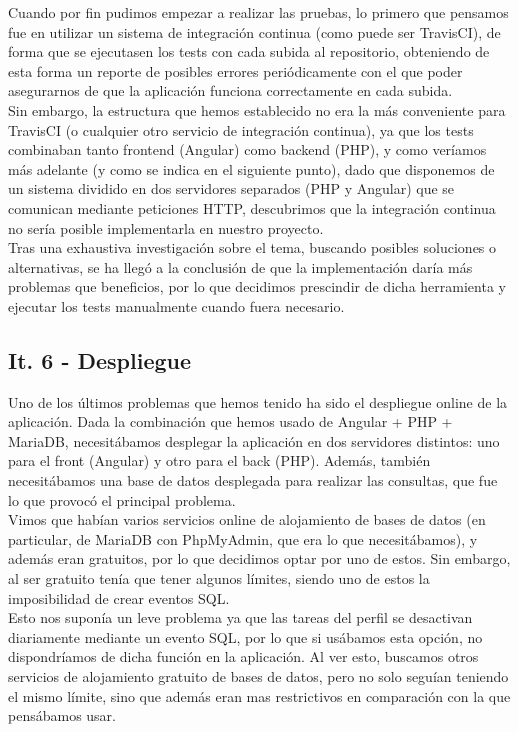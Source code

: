 Cuando por fin pudimos empezar a realizar las pruebas, lo primero que pensamos fue en utilizar un sistema de integración continua (como puede ser TravisCI), de forma que se ejecutasen los tests con cada subida al repositorio, obteniendo de esta forma un reporte de posibles errores periódicamente con el que poder asegurarnos de que la aplicación funciona correctamente en cada subida.\\

Sin embargo, la estructura que hemos establecido no era la más conveniente para TravisCI (o cualquier otro servicio de integración continua), ya que los tests combinaban tanto frontend (Angular) como backend (PHP), y como veríamos más adelante (y como se indica en el siguiente punto), dado que disponemos de un sistema dividido en dos servidores separados (PHP y Angular) que se comunican mediante peticiones HTTP, descubrimos que la integración continua no sería posible implementarla en nuestro proyecto.\\

Tras una exhaustiva investigación sobre el tema, buscando posibles soluciones o alternativas, se ha llegó a la conclusión de que la implementación daría más problemas que beneficios, por lo que decidimos prescindir de dicha herramienta y ejecutar los tests manualmente cuando fuera necesario.\\


\subsection{It. 6 - Despliegue}

Uno de los últimos problemas que hemos tenido ha sido el despliegue online de la aplicación. Dada la combinación que hemos usado de Angular + PHP + MariaDB, necesitábamos desplegar la aplicación en dos servidores distintos: uno para el front (Angular) y otro para el back (PHP). Además, también necesitábamos una base de datos desplegada para realizar las consultas, que fue lo que provocó el principal problema.\\

Vimos que habían varios servicios online de alojamiento de bases de datos (en particular, de MariaDB con PhpMyAdmin, que era lo que necesitábamos), y además eran gratuitos, por lo que decidimos optar por uno de estos. Sin embargo, al ser gratuito tenía que tener algunos límites, siendo uno de estos la imposibilidad de crear eventos SQL.\\

Esto nos suponía un leve problema ya que las tareas del perfil se desactivan diariamente mediante un evento SQL, por lo que si usábamos esta opción, no dispondríamos de dicha función en la aplicación. Al ver esto, buscamos otros servicios de alojamiento gratuito de bases de datos, pero no solo seguían teniendo el mismo límite, sino que además eran mas restrictivos en comparación con la que pensábamos usar.\\

